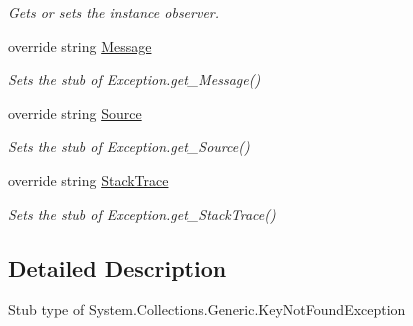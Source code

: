 \begin{DoxyCompactItemize}
\begin{DoxyCompactList}\small\item\em Gets or sets the instance observer.\end{DoxyCompactList}\item 
override string \hyperlink{class_system_1_1_collections_1_1_generic_1_1_fakes_1_1_stub_key_not_found_exception_a6c0643bf3d1280b044c530adc6155efd}{Message}
\begin{DoxyCompactList}\small\item\em Sets the stub of Exception.\-get\-\_\-\-Message()\end{DoxyCompactList}\item 
override string \hyperlink{class_system_1_1_collections_1_1_generic_1_1_fakes_1_1_stub_key_not_found_exception_a4ba298dfb161adf6d2b309d495323e20}{Source}
\begin{DoxyCompactList}\small\item\em Sets the stub of Exception.\-get\-\_\-\-Source()\end{DoxyCompactList}\item 
override string \hyperlink{class_system_1_1_collections_1_1_generic_1_1_fakes_1_1_stub_key_not_found_exception_a30d4a1b77e3f752b1452dc2ee6d33fce}{Stack\-Trace}
\begin{DoxyCompactList}\small\item\em Sets the stub of Exception.\-get\-\_\-\-Stack\-Trace()\end{DoxyCompactList}\end{DoxyCompactItemize}


\subsection{Detailed Description}
Stub type of System.\-Collections.\-Generic.\-Key\-Not\-Found\-Exception



